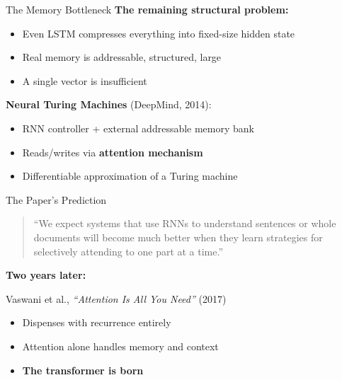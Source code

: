 \begin{frame}{The Memory Bottleneck}
    \textbf{The remaining structural problem:}
    \begin{itemize}
        \item Even LSTM compresses everything into fixed-size hidden state
        \item Real memory is addressable, structured, large
        \item A single vector is insufficient
    \end{itemize}
    
    \vspace{1em}
    \textbf{Neural Turing Machines} (DeepMind, 2014):
    \begin{itemize}
        \item RNN controller + external addressable memory bank
        \item Reads/writes via \textbf{attention mechanism}
        \item Differentiable approximation of a Turing machine
    \end{itemize}
\end{frame}

\begin{frame}{The Paper's Prediction}
    \begin{quote}
        ``We expect systems that use RNNs to understand sentences or whole documents will become much better when they learn strategies for selectively attending to one part at a time.''
    \end{quote}
    
    \vspace{1em}
    \textbf{Two years later:}
    
    \vspace{0.5em}
    Vaswani et al., \textit{``Attention Is All You Need''} (2017)
    \begin{itemize}
        \item Dispenses with recurrence entirely
        \item Attention alone handles memory and context
        \item \textbf{The transformer is born}
    \end{itemize}
\end{frame}
